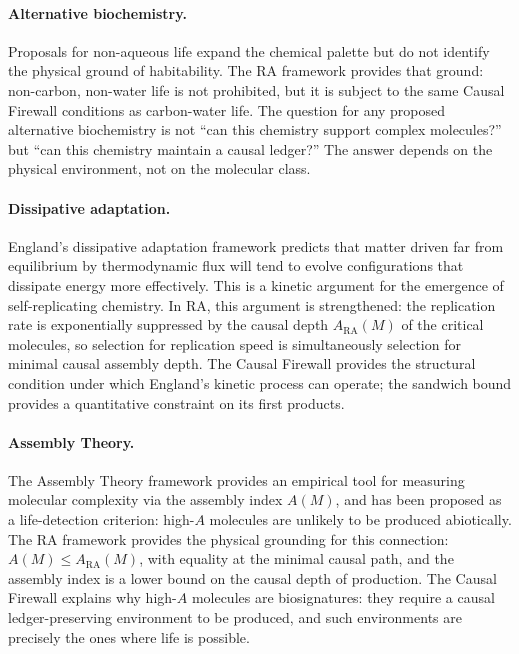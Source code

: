 \documentclass[11pt,a4paper]{article}
\theoremstyle{plain}
\theoremstyle{definition}
\theoremstyle{remark}
\newcommand{\ARA}{A_{\mathrm{RA}}}
\begin{document}
\paragraph{Alternative biochemistry.}
Proposals for non-aqueous life \citep{Benner2004} expand the chemical
palette but do not identify the physical ground of habitability. The RA
framework provides that ground: non-carbon, non-water life is not prohibited,
but it is subject to the same Causal Firewall conditions as carbon-water
life. The question for any proposed alternative biochemistry is not ``can
this chemistry support complex molecules?'' but ``can this chemistry
maintain a causal ledger?'' The answer depends on the physical environment,
not on the molecular class.

\paragraph{Dissipative adaptation.}
England's dissipative adaptation framework \citep{England2013} predicts
that matter driven far from equilibrium by thermodynamic flux will tend
to evolve configurations that dissipate energy more effectively. This
is a kinetic argument for the emergence of self-replicating chemistry.
In RA, this argument is strengthened: the replication rate is
exponentially suppressed by the causal depth $\ARA(M)$ of the critical
molecules, so selection for replication speed is simultaneously selection
for minimal causal assembly depth. The Causal Firewall provides the
structural condition under which England's kinetic process can operate;
the sandwich bound provides a quantitative constraint on its first
products.

\paragraph{Assembly Theory.}
The Assembly Theory framework \citep{Murray2023} provides an empirical
tool for measuring molecular complexity via the assembly index $A(M)$,
and has been proposed as a life-detection criterion: high-$A$ molecules
are unlikely to be produced abiotically. The RA framework provides the
physical grounding for this connection: $A(M) \leq \ARA(M)$, with equality
at the minimal causal path, and the assembly index is a lower bound on
the causal depth of production. The Causal Firewall explains why high-$A$
molecules are biosignatures: they require a causal ledger-preserving
environment to be produced, and such environments are precisely the
ones where life is possible.
\end{document}
